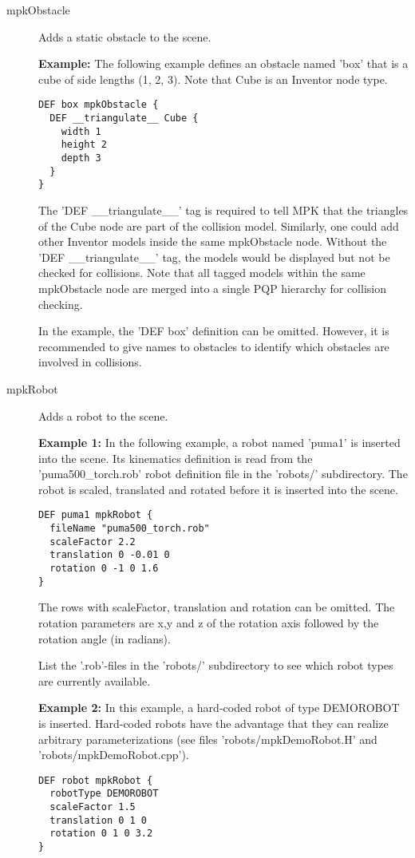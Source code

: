 \documentclass[letter,12pt]{article}
\begin{document}
\begin{description}
  
\item[mpkObstacle] Adds a static obstacle to the scene.
  
  {\bf Example:} The following example defines an obstacle named 'box'
  that is a cube of side lengths (1, 2, 3).  Note that Cube is an
  Inventor node type. 
\begin{verbatim}
DEF box mpkObstacle {
  DEF __triangulate__ Cube {
    width 1
    height 2
    depth 3
  }
}
\end{verbatim}
  
  The 'DEF \_\_triangulate\_\_' tag is required to tell MPK that the
  triangles of the Cube node are part of the collision model.
  Similarly, one could add other Inventor models inside the same
  mpkObstacle node.  Without the 'DEF \_\_triangulate\_\_' tag, the
  models would be displayed but not be checked for collisions.  Note
  that all tagged models within the same mpkObstacle node are merged
  into a single PQP hierarchy for collision checking.
  
  In the example, the 'DEF box' definition can be omitted.  However,
  it is recommended to give names to obstacles to identify which
  obstacles are involved in collisions.

\item[mpkRobot]  Adds a robot to the scene.
  
  {\bf Example 1:} In the following example, a robot named 'puma1' is
  inserted into the scene.  Its kinematics definition is read from the
  'puma500\_torch.rob' robot definition file in the 'robots/'
  subdirectory.  The robot is scaled, translated and rotated before it
  is inserted into the scene.
\begin{verbatim}
DEF puma1 mpkRobot {
  fileName "puma500_torch.rob"
  scaleFactor 2.2
  translation 0 -0.01 0
  rotation 0 -1 0 1.6
}
\end{verbatim}
  The rows with scaleFactor, translation and rotation can be omitted.
  The rotation parameters are x,y and z of the rotation axis followed
  by the rotation angle (in radians).
  
  List the '.rob'-files in the 'robots/' subdirectory to see which
  robot types are currently available.
  
  {\bf Example 2:} In this example, a hard-coded robot of type
  DEMOROBOT is inserted.  Hard-coded robots have the advantage that
  they can realize arbitrary parameterizations (see files
  'robots/mpkDemoRobot.H' and 'robots/mpkDemoRobot.cpp').
\begin{verbatim}
DEF robot mpkRobot {
  robotType DEMOROBOT
  scaleFactor 1.5
  translation 0 1 0
  rotation 0 1 0 3.2
}
\end{verbatim}
  

\end{description}
\end{document}
